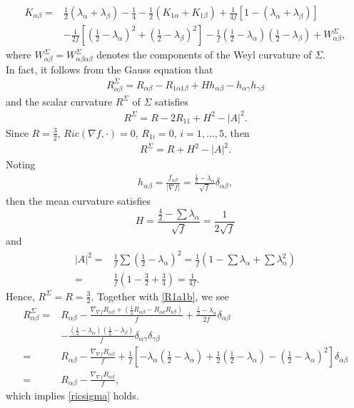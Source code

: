 \documentclass[12pt]{amsart}
\newcommand{\ban}{\begin{eqnarray*}}
\newcommand{\ean}{\end{eqnarray*}}
\begin{document}
	\begin{equation}\label{kab}
	\begin{aligned}
	K_{\alpha \beta }=&{\frac{1}{2}}(\lambda_{\alpha}+\lambda_{\beta})-{\frac{1}{4}}-{\frac{1}{2}}(K_{1\alpha }+K_{1\beta })+{\frac{1}{4f}}[1-(\lambda_{\alpha }+\lambda_{\beta})] \\
	&- {\frac{1}{2f}}\left[ ({\frac{1}{2}}-\lambda_{\alpha})^2+({\frac{1}{2}}-\lambda_{\beta})^2\right]-{\frac{1}{f}}({\frac{1}{2}}-\lambda_{\alpha})({\frac{1}{2}}-\lambda_{\beta})+W^{\Sigma}_{\alpha \beta },
	\end{aligned}
	\end{equation}
	where $W^{\Sigma}_{\alpha \beta}=W^{\Sigma}_{\alpha \beta\alpha \beta} $ denotes the components of the Weyl curvature of ${\Sigma}$.	\\
	
	
	In fact, it follows from the Gauss equation that
	\ban
	R^{\Sigma}_{\alpha  \beta }=R_{\alpha  \beta }-R_{1\alpha 1 \beta }+Hh_{\alpha  \beta }-h_{\alpha\gamma }h_{\gamma\beta}
	\ean
	and the scalar curvature $R^{\Sigma}$ of ${\Sigma}$ satisfies
	\ban
	R^{\Sigma}=R-2R_{11}+H^2-|A|^2.
	\ean
	Since $R=\frac{3}{2}$, $Ric(\nabla f, \cdot)=0$, $R_{1i}=0$, $i=1,...,5$, then
	\ban
	R^{\Sigma}=R+H^2-|A|^2.
	\ean
	Noting
	\ban
	h_{\alpha \beta }=\frac{f_{\alpha \beta }}{|\nabla f|}=\frac{\frac{1}{2}-\lambda_\alpha}{\sqrt{f}}\delta_{\alpha \beta},
	\ean
	then the mean curvature satisfies
	\[
	H=\frac{\frac{4}{2}-\sum\lambda_\alpha}{\sqrt{f}}=\frac{1}{2\sqrt{f}}
	\]
	and
	\begin{align*}
	|A|^2=&\frac{1}{f}\sum(\frac{1}{2}-\lambda_\alpha)^2=\frac{1}{f}(1-\sum\lambda_\alpha+\sum \lambda_\alpha^2)\\
	=&\frac{1}{f}(1-\frac{3}{2}+\frac{3}{4})=\frac{1}{4f}.
	\end{align*}
	Hence, $R^{\Sigma}=R=\frac{3}{2}$. Together with \eqref{R1a1b}, we see
	\begin{equation*}
	\begin{aligned}
	R^{\Sigma}_{\alpha  \beta }=&R_{\alpha  \beta }-\frac{\nabla_{\nabla f} R_{\alpha \beta}+\left( \frac{1}{2}R_{\alpha \beta}-R_{\alpha k}R_{k\beta}\right) }{f}
	+\frac{\frac{1}{2}-\lambda_\alpha}{2f}\delta_{\alpha \beta}\\
	&-\frac{(\frac{1}{2}-\lambda_\alpha)(\frac{1}{2}-\lambda_\beta)}{f}\delta_{\alpha \gamma}\delta_{\gamma\beta}\\
	=&R_{\alpha  \beta }-\frac{ \nabla_{\nabla f} R_{\alpha \beta}}{f}+\frac{1}{f}[-\lambda_\alpha(\frac{1}{2}-\lambda_\alpha)+\frac{1}{2}(\frac{1}{2}-\lambda_\alpha)-(\frac{1}{2}-\lambda_\alpha)^2]\delta_{\alpha \beta}\\
	=&R_{\alpha  \beta }-\frac{\nabla _{\nabla f}  R_{\alpha \beta}}{f},
	\end{aligned}
	\end{equation*}
	which implies \eqref{ricsigma} holds.
	
\end{document}
